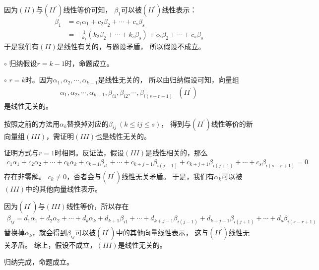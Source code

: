 \documentclass{article}
\begin{document}
\begin{itemize}
        因为$(II)$与$(II^\prime)$线性等价可知，
        $\beta_1$可以被$(II^\prime)$线性表示：
        \begin{align*}
          \beta_1 & = c_1 \alpha_1 + c_2 \beta_2 + \cdots + c_s \beta_s                                         \\
                  & = - \frac{1}{k_1} (k_2 \beta_2 + \cdots + k_s \beta_s) + c_2 \beta_2 + \cdots + c_s \beta_s
        \end{align*}
        于是我们有$(II)$是线性有关的，与题设矛盾，
        所以假设不成立。

        $\circ$ 归纳假设$r = k - 1$时，命题成立。

        $\circ$ $r = k$时。因为$\alpha_1, \alpha_2, \cdots, \alpha_{k - 1}$是线性无关的，
        所以由归纳假设可知，向量组
        \begin{align*}
          \alpha_1, \alpha_2, \cdots, \alpha_{k - 1}, \beta_{i1}, \beta_{i2}, \cdots, \beta_{i(s - r + 1)} \ \ \ (II^\prime)
        \end{align*}
        是线性无关的。

        按照之前的方法用$\alpha_k$替换掉对应的$\beta_{ij} \ (k \leq ij \leq s)$，
        得到与$(II^\prime)$线性等价的新向量组$(III)$，需证明$(III)$也是线性无关的。

        证明方式与$r = 1$时相同。反证法，假设$(III)$是线性相关的，那么
        \begin{align*}
          c_1 \alpha_1 + c_2 \alpha_2 + \cdots + c_k \alpha_k
          + c_{k + 1} \beta_{i1} + \cdots + c_{k + j - 1} \beta_{i(j-1)}
          + c_{k + j + 1} \beta_{i(j+1)} + \cdots
          + c_s \beta_{i(s - r + 1)} = 0
        \end{align*}
        存在非零解。
        $c_k \neq 0$，否者会与$(II^\prime)$线性无关矛盾。
        于是，我们有$\alpha_k$可以被$(III)$中的其他向量线性表示。

        因为$(II^\prime)$与$(III)$线性等价，所以存在
        \begin{align*}
          \beta_{ij} = d_1 \alpha_1 + d_2 \alpha_2 + \cdots + d_k \alpha_k
          + d_{k + 1} \beta_{i1} + \cdots + d_{k + j - 1} \beta_{i(j-1)}
          + d_{k + j + 1} \beta_{i(j+1)} + \cdots
          + d_s \beta_{i(s - r + 1)}
        \end{align*}
        替换掉$\alpha_k$，就会得到$\beta_{ij}$可以被$(II^\prime)$中的其他向量线性表示，
        这与$(II^\prime)$线性无关矛盾。
        综上，假设不成立，$(III)$是线性无关的。

        归纳完成，命题成立。
\end{itemize}
\end{document}
